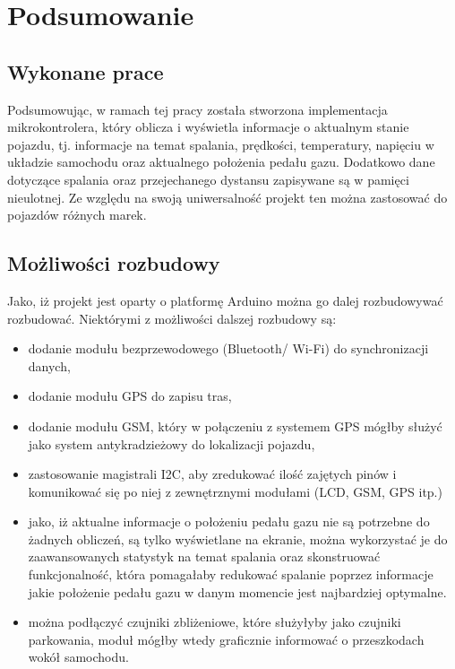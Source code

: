 \chapter{Podsumowanie}
\section{Wykonane prace}
Podsumowując, w ramach tej pracy została stworzona implementacja mikrokontrolera, który oblicza i wyświetla informacje o aktualnym stanie pojazdu, tj. informacje na temat spalania, prędkości, temperatury, napięciu w układzie samochodu oraz aktualnego położenia pedału gazu. Dodatkowo dane dotyczące spalania oraz przejechanego dystansu zapisywane są w pamięci nieulotnej. Ze względu na swoją uniwersalność projekt ten można zastosować do pojazdów różnych marek.
\section{Możliwości rozbudowy}
Jako, iż projekt jest oparty o platformę Arduino można go dalej rozbudowywać rozbudować. Niektórymi z możliwości dalszej rozbudowy są:
\begin{itemize}
\item dodanie modułu bezprzewodowego (Bluetooth/ Wi-Fi) do synchronizacji danych,
\item dodanie modułu GPS do zapisu tras,
\item dodanie modułu GSM, który w połączeniu z systemem GPS mógłby służyć jako system antykradzieżowy do lokalizacji pojazdu,
\item zastosowanie magistrali I2C, aby zredukować ilość zajętych pinów i komunikować się po niej z zewnętrznymi modułami (LCD, GSM, GPS itp.)
\item jako, iż aktualne informacje o położeniu pedału gazu nie są potrzebne do żadnych obliczeń, są tylko wyświetlane na ekranie, można wykorzystać je do zaawansowanych statystyk na temat spalania oraz skonstruować funkcjonalność, która pomagałaby redukować spalanie poprzez informacje jakie położenie pedału gazu w danym momencie jest najbardziej optymalne.
\item można podłączyć czujniki zbliżeniowe, które służyłyby jako czujniki parkowania, moduł mógłby wtedy graficznie informować o przeszkodach wokół samochodu.
\end{itemize}
